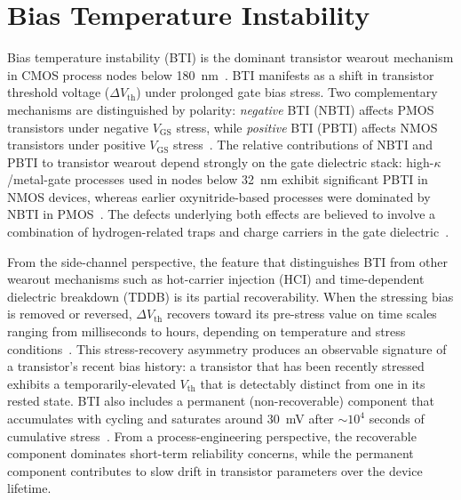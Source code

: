 \section{Bias Temperature Instability}
\label{sec:bg-bti}

Bias temperature instability (BTI) is the dominant transistor wearout
mechanism in CMOS process nodes below 180~nm~\cite{novak2015intel14,
	22nmTrigate, mahapatra2016fundamentals}. BTI manifests as a shift in
transistor threshold voltage ($\Delta V_\text{th}$) under prolonged gate
bias stress. Two complementary mechanisms are distinguished by polarity:
\emph{negative} BTI (NBTI) affects PMOS transistors under negative
$V_\text{GS}$ stress, while \emph{positive} BTI (PBTI) affects NMOS
transistors under positive $V_\text{GS}$
stress~\cite{schroder2003negative, mahapatra2016fundamentals,
	amouri2014aging}. The relative contributions of NBTI and PBTI to
transistor wearout depend strongly on the gate dielectric stack:
high-$\kappa$/metal-gate processes used in nodes below 32~nm exhibit
significant PBTI in NMOS devices, whereas earlier oxynitride-based
processes were dominated by NBTI in
PMOS~\cite{mahapatra2016fundamentals, novak2015intel14, 22nmTrigate}.
The defects underlying both effects are believed to involve a
combination of hydrogen-related traps and charge carriers in the gate
dielectric~\cite{bti_modelling_2013, mahapatra2016fundamentals}.

From the side-channel perspective, the feature that distinguishes BTI
from other wearout mechanisms such as hot-carrier injection (HCI) and
time-dependent dielectric breakdown (TDDB) is its partial
recoverability. When the stressing bias is removed or reversed, $\Delta
	V_\text{th}$ recovers toward its pre-stress value on time scales ranging
from milliseconds to hours, depending on temperature and stress
conditions~\cite{stott2010degradation, ramey2014bti, grasser2016PRNBTI,
	bti_modelling_2013}. This stress-recovery asymmetry produces an
observable signature of a transistor's recent bias history: a transistor
that has been recently stressed exhibits a temporarily-elevated
$V_\text{th}$ that is detectably distinct from one in its rested state.
BTI also includes a permanent (non-recoverable) component that
accumulates with cycling and saturates around 30~mV after $\sim 10^4$
seconds of cumulative stress~\cite{grasser2011permanentifc,
	grasser2016PRNBTI}. From a process-engineering perspective, the
recoverable component dominates short-term reliability concerns, while
the permanent component contributes to slow drift in transistor
parameters over the device lifetime.

